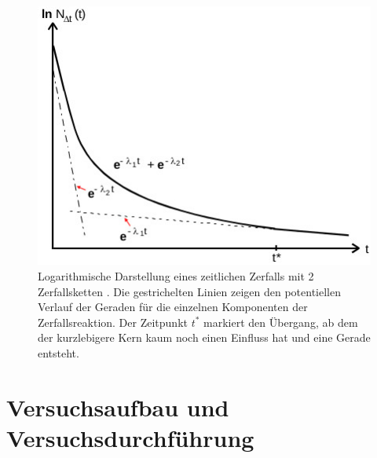\begin{figure}[H]
    \centering
    \includegraphics[width=\linewidth]{images/Rh_theo.jpg}
    \caption{Logarithmische Darstellung eines zeitlichen Zerfalls mit
    2 Zerfallsketten \cite{V702}.
    Die gestrichelten Linien zeigen den potentiellen Verlauf der Geraden für die 
    einzelnen Komponenten der Zerfallsreaktion. Der Zeitpunkt $t^*$ markiert den Übergang, ab
    dem der kurzlebigere Kern kaum noch einen Einfluss hat und eine Gerade entsteht.
    }
    \label{fig:2}
\end{figure}



\section{Versuchsaufbau und Versuchsdurchführung}\justifying

